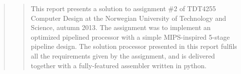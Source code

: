 \begin{quote}
\begin{quote}
This report presents a solution to assignment \#2 of TDT4255 Computer Design at the Norwegian University of Technology and Science, autumn 2013.
The assignment was to implement an optimized pipelined processor with a simple MIPS-inspired 5-stage pipeline design.
The solution processor presented in this report fulfils all the requirements given by the assignment, and is delivered together with a fully-featured assembler written in python.
\end{quote}
\end{quote}
